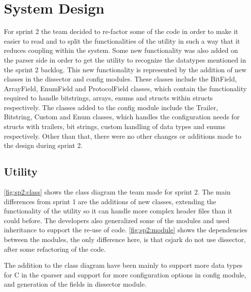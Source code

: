 \section{System Design}
\label{sec:sp2:design}
For sprint 2 the team decided to re-factor some of the code in order to make it easier to read and to split the functionalities of the \gls{utility} in such a way that it reduces coupling within the system. Some new functionality was also added on the \gls{parser} side in order to get the \gls{utility} to recognize the datatypes mentioned in the sprint 2 backlog. This new functionality is represented by the addition of new classes in the \gls{dissector} and config modules. These classes include the BitField, ArrayField, EnumField and ProtocolField classes, which contain the functionality required to handle bitstrings, \glspl{array}, \glspl{enum} and \glspl{struct} within \glspl{struct} respectively. The classes added to the config module include the Trailer, Bitstring, Custom and Enum classes, which handles the configuration needs for \glspl{struct} with \gls{trailers}, \glspl{bit string}, custom handling of data types and \glspl{enum} respectively. Other than that, there were no other changes or additions made to the design during sprint 2.

\subsection{Utility}
\autoref{fig:sp2:class} shows the class diagram the team made for sprint 2. 
The main differences from sprint 1 are the additions of new classes, extending 
the functionality of the \gls{utility} so it can handle 
more complex \gls{header} files than it could before. The developers also 
generalized some of the modules and used inheritance to support the re-use of 
code. \autoref{fig:sp2:module} shows the dependencies between the modules,
the only difference here, is that csjark do not use dissector, after some refactoring
of the code.

The addition to the class diagram have been mainly to support more data types 
for C in the cparser and support for more configuration options in config 
module, and generation of the fields in dissector module.
 

